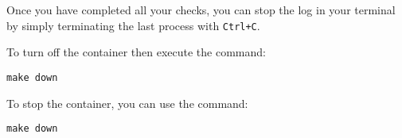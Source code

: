 Once you have completed all your checks, you can stop the log in your terminal by simply terminating the last process with \texttt{Ctrl+C}.

To turn off the container then execute the command:
\begin{verbatim}
make down
\end{verbatim}

To stop the container, you can use the command:
\begin{verbatim}
make down
\end{verbatim}

